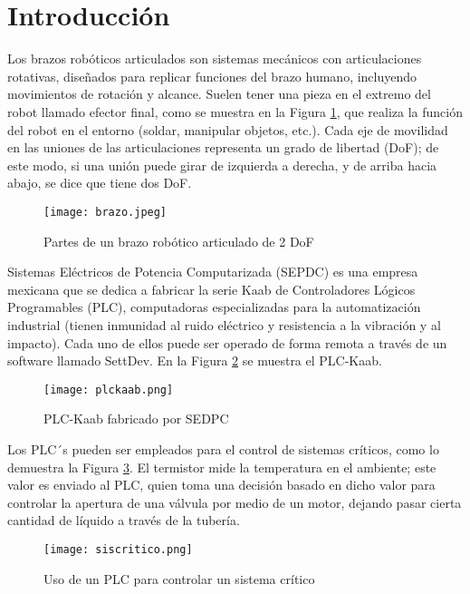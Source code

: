 \section{Introducci\'on}

Los brazos robóticos articulados son sistemas mecánicos con articulaciones rotativas, diseñados para replicar funciones del brazo humano, incluyendo movimientos de rotación y alcance. Suelen tener una pieza en el extremo del robot llamado efector final, como se muestra en la Figura \ref{fig:brazoR}, que realiza la función del robot en el entorno (soldar, manipular objetos, etc.). Cada eje de movilidad en las uniones de las articulaciones representa un grado de libertad (DoF); de este modo, si una unión puede girar de izquierda a derecha, y de arriba hacia abajo, se dice que tiene dos DoF.

\vspace{1cm}

\begin{figure}[htb]
	\centering
	\texttt{[image: brazo.jpeg]}
	\caption{Partes de un brazo robótico articulado de 2 DoF}
	\label{fig:brazoR}
\end{figure}

\newpage
Sistemas Eléctricos de Potencia Computarizada (SEPDC) es una empresa mexicana que se dedica a fabricar la serie Kaab de Controladores Lógicos Programables (PLC), computadoras especializadas para la automatización industrial (tienen inmunidad al ruido eléctrico y resistencia a la vibración y al impacto). Cada uno de ellos puede ser operado de forma remota a través de un software llamado SettDev. En la Figura \ref{fig:plc} se muestra el PLC-Kaab.

\begin{figure}[htb]
	\centering
	\texttt{[image: plckaab.png]}
	\caption{PLC-Kaab fabricado por SEDPC}
	\label{fig:plc}
\end{figure}

Los PLC´s pueden ser empleados para el control de sistemas críticos, como lo demuestra la Figura \ref{fig:siscritico}. El termistor mide la temperatura en el ambiente; este valor es enviado al PLC, quien toma una decisión basado en dicho valor para controlar la apertura de una válvula por medio de un motor, dejando pasar cierta cantidad de líquido a través de la tubería.

\begin{figure}[htb]
	\centering
	\texttt{[image: siscritico.png]}
	\caption{Uso de un PLC para controlar un sistema crítico}
	\label{fig:siscritico}
\end{figure}